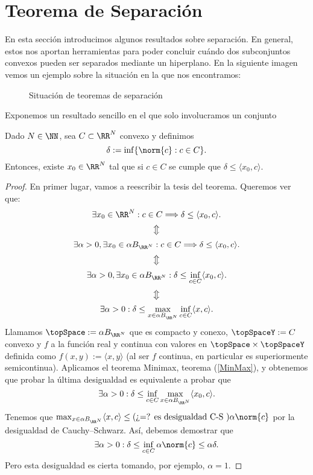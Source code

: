 \chapter{Teorema de Separación}

En esta sección introducimos algunos resultados sobre separación. En general, estos nos aportan herramientas para poder concluir cuándo dos subconjuntos convexos pueden ser separados mediante un hiperplano. En la siguiente imagen vemos un ejemplo sobre la situación en la que nos encontramos:

\begin{figure}[h!]\label{prueba}
\begin{center}
\end{center}
\caption{Situación de teoremas de separación}
\end{figure}

Exponemos un resultado sencillo en el que solo involucramos un conjunto

\begin{teoremaBox}\label{sep1}
Dado $ N \in \NN $, sea $ C \subset \RR^N $ convexo y definimos
\[
\delta := \inf\{ \norm{c}: c \in C \}.
\]
Entonces, existe $ x_0 \in \RR^N $ tal que si $ c \in C $ se cumple que $ \delta \leq \langle x_0,c\rangle $.
\end{teoremaBox}
\begin{proof}
En primer lugar, vamos a reescribir la tesis del teorema. Queremos ver que:
\[
\exists x_0 \in \RR^N : c \in C \Longrightarrow \delta \leq \langle x_0,c\rangle.
\]
\[
\big\Updownarrow
\]
\[
\exists \alpha > 0, \exists x_0 \in \alpha B_{\RR^N} : c \in C \Longrightarrow \delta \leq \langle x_0,c\rangle.
\]
\[
\big\Updownarrow
\]
\[
\exists \alpha > 0, \exists x_0 \in \alpha B_{\RR^N} : \delta \leq \inf_{c\in C}\langle x_0,c\rangle.
\]
\[
\big\Updownarrow
\]
\[
\exists \alpha > 0 : \delta \leq \max_{x\in \alpha B_{\RR^N}}\inf_{c\in C}\langle x,c\rangle.
\]
Llamamos $ \topSpace := \alpha B_{\RR^N}$ que es compacto y conexo, $ \topSpaceY:= C$ convexo y $ f $ a la función real y continua con valores en $ \topSpace \times \topSpaceY $ definida como $ f(x,y):=\langle x,y \rangle $ (al ser $ f $ continua, en particular es superiormente semicontinua). Aplicamos el teorema Minimax, teorema (\ref{MinMax}), y obtenemos que probar la última desigualdad es equivalente a probar que
\[
\exists \alpha > 0 : \delta \leq \inf_{c\in C}\max_{x\in \alpha B_{\RR^N}}\langle x_0,c\rangle.
\]
Tenemos que $ \max_{x\in \alpha B_{\RR^N}}\langle x,c\rangle \leq \text{(¿=? es desigualdad C-S )} \alpha \norm{c} $ por la desigualdad de Cauchy–Schwarz. Así, debemos demostrar que
\[
\exists \alpha > 0 : \delta \leq \inf_{c\in C} \alpha \norm{c} \leq \alpha \delta.
\]
Pero esta desigualdad es cierta tomando, por ejemplo, $ \alpha = 1 $.
\end{proof}

